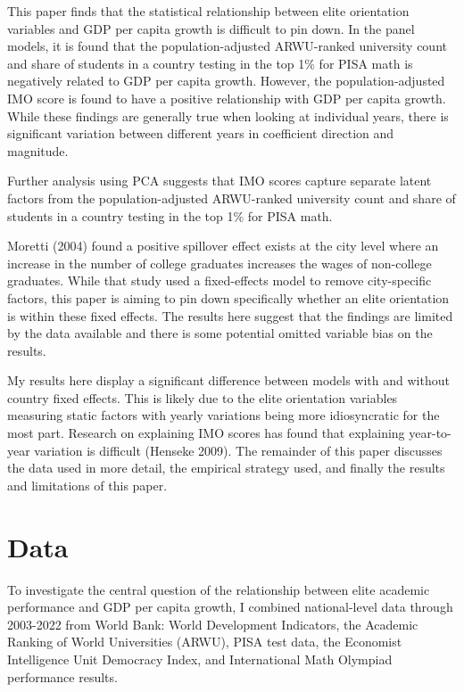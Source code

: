 \documentclass[11pt]{article}
\begin{document}
This paper finds that the statistical relationship between elite orientation variables and GDP per capita growth is difficult to pin down. In the panel models, it is found that the population-adjusted ARWU-ranked university count and share of students in a country testing in the top 1\% for PISA math is negatively related to GDP per capita growth. However, the population-adjusted IMO score is found to have a positive relationship with GDP per capita growth. While these findings are generally true when looking at individual years, there is significant variation between different years in coefficient direction and magnitude.

Further analysis using PCA suggests that IMO scores capture separate latent factors from the population-adjusted ARWU-ranked university count and share of students in a country testing in the top 1\% for PISA math.

Moretti (2004) found a positive spillover effect exists at the city level where an increase in the number of college graduates increases the wages of non-college graduates. While that study used a fixed-effects model to remove city-specific factors, this paper is aiming to pin down specifically whether an elite orientation is within these fixed effects. The results here suggest that the findings are limited by the data available and there is some potential omitted variable bias on the results.

My results here display a significant difference between models with and without country fixed effects. This is likely due to the elite orientation variables measuring static factors with yearly variations being more idiosyncratic for the most part. Research on explaining IMO scores has found that explaining year-to-year variation is difficult (Henseke 2009).
The remainder of this paper discusses the data used in more detail, the empirical strategy used, and finally the results and limitations of this paper.

\section{Data}
To investigate the central question of the relationship between elite academic performance and GDP per capita growth, I combined national-level data through 2003-2022 from World Bank: World Development Indicators, the Academic Ranking of World Universities (ARWU), PISA test data, the Economist Intelligence Unit Democracy Index, and International Math Olympiad performance results.
\end{document}
